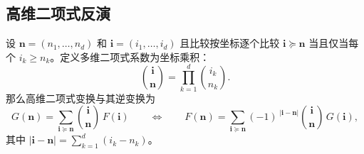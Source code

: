 \subsection{高维二项式反演}

\begin{theorem}
  设 $\mathbf{n}=(n_1,\dots,n_d)$ 和 $ \mathbf{i}=(i_1,\dots,i_d)$ 且比较按坐标逐个比较 $\mathbf{i}\succeq\mathbf{n}$ 当且仅当每个 $i_k\ge n_k$。定义多维二项式系数为坐标乘积：
$$
\binom{\mathbf{i}}{\mathbf{n}}=\prod_{k=1}^d \binom{i_k}{n_k}.
$$
那么高维二项式变换与其逆变换为
$$
G(\mathbf{n})=\sum_{\mathbf{i}\succeq\mathbf{n}}\binom{\mathbf{i}}{\mathbf{n}}\,F(\mathbf{i})
\qquad\Longleftrightarrow\qquad
F(\mathbf{n})=\sum_{\mathbf{i}\succeq\mathbf{n}}(-1)^{\;|\mathbf{i}-\mathbf{n}|}\binom{\mathbf{i}}{\mathbf{n}}\,G(\mathbf{i}),
$$
其中 $|\mathbf{i}-\mathbf{n}|=\sum_{k=1}^d (i_k-n_k)$。
\end{theorem}